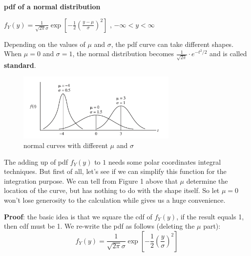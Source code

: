 \documentclass[11pt]{article}
\begin{document}
\begin{tcolorbox}[
	enhanced, 
	width=\textwidth, 
	fontupper=\normalsize,%
	drop fuzzy shadow southwest,
	boxrule=0.4pt,
	sharp corners,
	colframe=yellow!80!black,
	colback=yellow!10]
	
\textbf{\color{RoyalBlue} pdf of a normal distribution} 
\begin{center}
$\displaystyle f_Y(y) = \frac{1}{\sqrt{2\pi} \sigma} \exp \left[ - \frac{1}{2} \left( \frac{y - \mu }{\sigma} \right) ^ 2 \right]$ \hspace{5pt},  \hspace{5pt} $-\infty < y < \infty$
\end{center}

\end{tcolorbox}

Depending on the values of $\mu$ and $\sigma$,  the pdf curve can take different shapes.  When $\mu = 0$ and $\sigma = 1$,  the normal distribution becomes $\displaystyle  \frac{1}{\sqrt{2\pi}} \cdot e^{-t^2/2} $ and is called \textbf{standard}. 

\begin{figure}[H] %
	\centering
 	\includegraphics[width=0.7\textwidth]{normal_shapes}
 	\caption{normal curves with different $\mu$ and $\sigma$}
  	\label{fig:}
\end{figure}

The adding up of pdf $f_Y(y)$ to $1$ needs some polar coordinates integral techniques.  But first of all,  let's see if we can simplify this function for the integration purpose.  We can tell from Figure 1 above that $\mu$ determine the location of the curve,  but has nothing to do with the shape itself.  So let $\mu = 0$ won't lose generosity to the calculation while gives us a huge convenience.   

\textbf {Proof}:  the basic idea is that we square the cdf of $f_Y(y)$,  if the result equals 1,  then cdf must be 1.  We re-write the pdf as follows (deleting the $\mu$ part):
$$ 
f_Y(y) = \frac{1}{\sqrt{2\pi} \sigma} \exp \left[ - \frac{1}{2} \left( \frac{y}{\sigma} \right) ^ 2 \right]
$$
\end{document}
